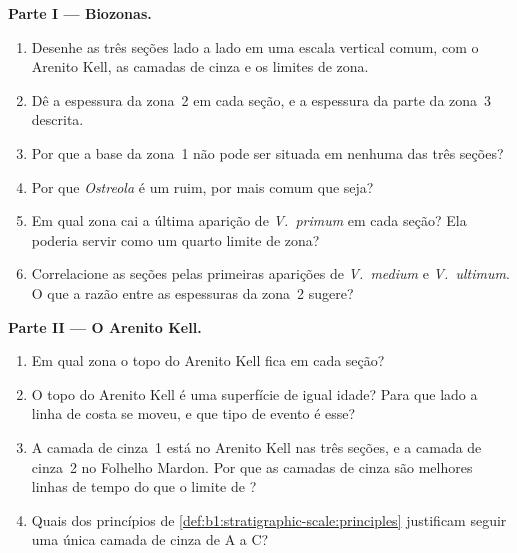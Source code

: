 \begin{problem}
\medskip
\noindent\textbf{Parte I --- Biozonas.}
\begin{enumerate}
  \item Desenhe as três seções lado a lado em uma escala vertical comum, com o Arenito Kell, as
        camadas de cinza e os limites de zona.
  \item Dê a espessura da zona~2 em cada seção, e a espessura da parte da zona~3 descrita.
  \item Por que a base da zona~1 não pode ser situada em nenhuma das três seções?
  \item Por que \emph{Ostreola} é um  ruim, por mais comum que seja?
  \item Em qual zona cai a última aparição de \emph{V.~primum} em cada seção? Ela poderia servir
        como um quarto limite de zona?
  \item Correlacione as seções pelas primeiras aparições de \emph{V.~medium} e \emph{V.~ultimum}.
        O que a razão entre as espessuras da zona~2 sugere?
\end{enumerate}

\noindent\textbf{Parte II --- O Arenito Kell.}
\begin{enumerate}[resume]
  \item Em qual zona o topo do Arenito Kell fica em cada seção?
  \item O topo do Arenito Kell é uma superfície de igual idade? Para que lado a linha de costa se
        moveu, e que tipo de evento é esse?
  \item A camada de cinza~1 está no Arenito Kell nas três seções, e a camada de cinza~2 no
        Folhelho Mardon. Por que as camadas de cinza são melhores linhas de tempo do que o limite
        de ?
  \item Quais dos princípios de
        \cref{def:b1:stratigraphic-scale:principles} justificam seguir uma única camada de cinza
        de A a C?
\end{enumerate}


\end{problem}
